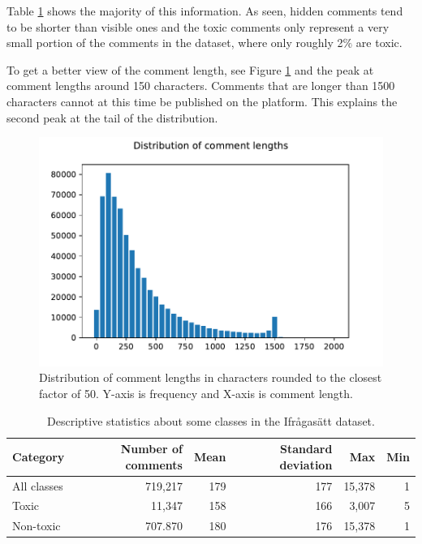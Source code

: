 \documentclass[nofilelist]{cslthse-msc}
\begin{document}
Table \ref{tab:deskriptiv} shows the majority of this information. As seen, hidden comments tend to be shorter than visible ones and the toxic comments only represent a very small portion of the comments in the dataset, where only roughly 2$\%$ are toxic. 

To get a better view of the comment length, see Figure \ref{fig:distribution} and the peak at comment lengths around 150 characters. Comments that are longer than 1500 characters cannot at this time be published on the platform. This explains the second peak at the tail of the distribution.

\begin{figure}[t]
    \centering
    \includegraphics{langddistribution.pdf}
    \caption{Distribution of comment lengths in characters rounded to the closest factor of 50. Y-axis is frequency and X-axis is comment length.}
    \label{fig:distribution}
\end{figure}

\begin{table}[t]
\centering
\begin{tabular}{@{}lrrrrr@{}}
\toprule
Category    & Number of comments & Mean & Standard deviation & Max   & Min \\ \midrule
All classes & 719,217 & 179  & 177                & 15,378 & 1   \\
Toxic       & 11,347 & 158  & 166                & 3,007  & 5   \\ 
Non-toxic   & 707.870 & 180 & 176 & 15,378 & 1 \\\bottomrule
\end{tabular}
\caption{Descriptive statistics about some classes in the Ifrågasätt dataset.}
\label{tab:deskriptiv}
\end{table}
\end{document}
